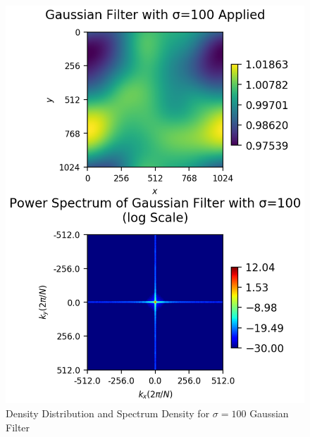 \documentclass[a4paper,10pt]{article}
\begin{document}
\begin{large}
\begin{figure}[htbp] %
\centering %
\includegraphics[width=14cm]{sigma=100.png} %
\caption{Density Distribution and Spectrum Density for $\sigma=100$ Gaussian Filter}
\end{figure}

\end{large}

\newpage
\end{document}
